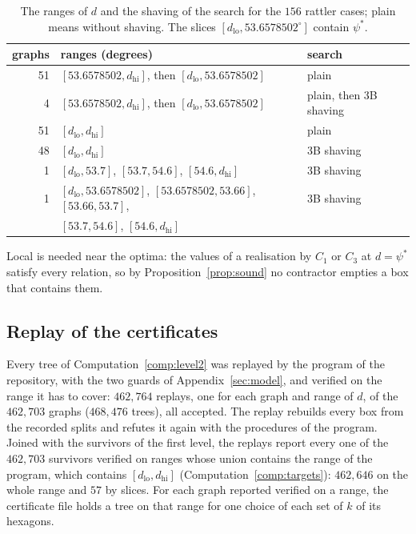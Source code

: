 \documentclass[12pt]{amsart}
\theoremstyle{definition}
\theoremstyle{plain}
\theoremstyle{definition}
\newcommand{\psis}{\psi^{*}}
\newcommand{\dlo}{d_{\mathrm{lo}}}
\newcommand{\dhi}{d_{\mathrm{hi}}}
\newcommand{\CI}{C_1}
\newcommand{\CIII}{C_3}
\newcommand{\codemap}[1]{\ignorespaces}
\begin{document}
\begin{table}[ht]
\caption{The ranges of $d$ and the shaving of the search for the $156$ rattler cases; plain means without shaving. The slices $[\dlo,53.6578502^\circ]$ contain $\psis$.}\label{tab:passes}
\centering
\begin{tabular}{rll}
graphs & ranges (degrees) & search\\\hline
51 & $[53.6578502,\dhi]$, then $[\dlo,53.6578502]$ & plain\\
4 & $[53.6578502,\dhi]$, then $[\dlo,53.6578502]$ & plain, then 3B shaving\\
51 & $[\dlo,\dhi]$ & plain\\
48 & $[\dlo,\dhi]$ & 3B shaving\\
1 & $[\dlo,53.7]$, $[53.7,54.6]$, $[54.6,\dhi]$ & 3B shaving\\
1 & $[\dlo,53.6578502]$, $[53.6578502,53.66]$, $[53.66,53.7]$, & 3B shaving\\
 & $[53.7,54.6]$, $[54.6,\dhi]$ &
\end{tabular}
\end{table}

Local is needed near the optima: the values of a realisation by $\CI$ or $\CIII$ at $d=\psis$ satisfy every relation, so by Proposition~\ref{prop:sound} no contractor empties a box that contains them.

\subsection{Replay of the certificates}\label{sec:replay}\codemap{code/impl1/replay_summary.sh > code/impl1/out/guarded/replay_summary.txt, code/impl1/coverage_join.sh > code/impl1/out/guarded/coverage_join.txt}
Every tree of Computation~\ref{comp:level2} was replayed by the program of the repository, with the two guards of Appendix~\ref{sec:model}, and verified on the range it has to cover: $462{,}764$ replays, one for each graph and range of $d$, of the $462{,}703$ graphs ($468{,}476$ trees), all accepted. The replay rebuilds every box from the recorded splits and refutes it again with the procedures of the program. Joined with the survivors of the first level, the replays report every one of the $462{,}703$ survivors verified on ranges whose union contains the range of the program, which contains $[\dlo,\dhi]$ (Computation~\ref{comp:targets}): $462{,}646$ on the whole range and $57$ by slices. For each graph reported verified on a range, the certificate file holds a tree on that range for one choice of each set of $k$ of its hexagons.
\end{document}
